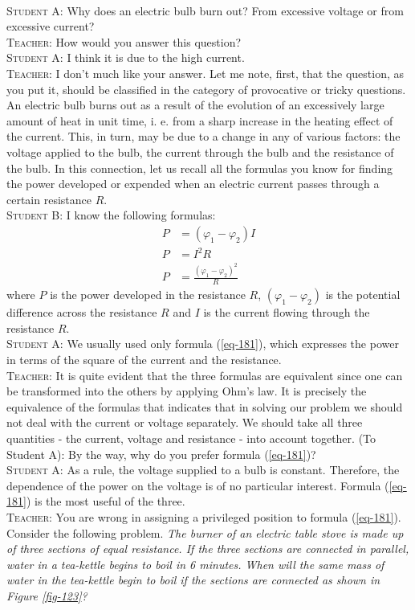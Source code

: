 \documentclass[a4paper,sfsidenotes]{tufte-book}
\begin{document}
\paragraph{}
\textsc{Student A:} Why does an electric bulb burn out? From excessive voltage or from excessive current?
\\
\textsc{Teacher:} How would you answer this question?
\\
\textsc{Student A:} I think it is due to the high current.
\\
\textsc{Teacher:} I don't much like your answer. Let me note, first, that the question, as you put it,
should be classified in the category of provocative or tricky questions. An electric bulb burns out as a result of the evolution of an excessively large amount of heat in unit time, i. e. from a sharp increase in the heating effect of the current. This, in turn, may be due to a change in any of various factors: the voltage applied to the bulb, the current through the bulb and the resistance of the bulb. In this connection, let us recall all the formulas you know for finding the power developed or expended when an electric current passes through a certain resistance $R$.
\\
\textsc{Student B:} I know the following formulas:
\begin{align} 
P & = (\varphi_{1} -\varphi_{2})I \label{eq-180}\\
P & =I^{2} R \label{eq-181}\\
P & = \frac{ \left( \varphi_{1} -\varphi_{2} \right)^{2}}{R} \label{eq-182}
\end{align}
where $P$ is the power developed in the resistance $R$, $(\varphi_{1} -\varphi_{2})$ is the potential difference across the resistance $R$ and $I$ is the current flowing through the resistance $R$.
\\
\textsc{Student A:} We usually used only formula (\ref{eq-181}), which expresses the power in terms of the square of the current and the resistance.
\\
\textsc{Teacher:} It is quite evident that the three formulas are equivalent since one can be transformed into the others by applying Ohm's law. It is precisely the equivalence of the formulas that indicates that in solving our problem we should not deal with the current or voltage separately. We should take all three quantities - the current, voltage and resistance - into account together. (To Student A): By the way, why do you prefer formula (\ref{eq-181})?
\\
\textsc{Student A:} As a rule, the voltage supplied to a bulb is constant. Therefore, the dependence of the power on the voltage is of no particular interest. Formula (\ref{eq-181}) is the most useful of the three.
\\
\textsc{Teacher:} You are wrong in assigning a privileged position to formula (\ref{eq-181}). Consider the following problem. \emph{The burner of an electric table stove is made up of three sections of equal resistance. If the three sections are connected in parallel, water in a tea-kettle begins to boil in 6 minutes. When will the same mass of water in the tea-kettle begin to boil if the sections are connected as shown in \emph{Figure \ref{fig-123}}?}
\end{document}
